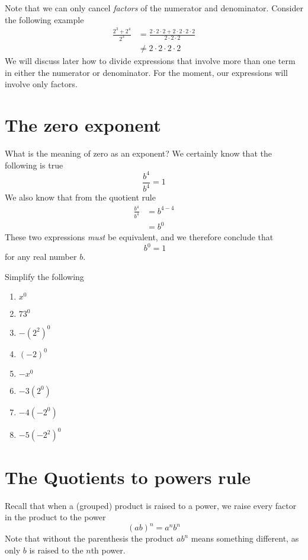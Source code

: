 Note that we can only cancel {\em factors} of the numerator and denominator. Consider the following example
\begin{align*}
	\frac{2^3+2^4}{2^3} & =	 \frac{2\cdot 2\cdot 2 + 2\cdot2\cdot2\cdot2}{2\cdot 2\cdot 2} \\
	                    & \ne	 2\cdot 2\cdot 2\cdot 2                                      
\end{align*} 
We will discuss later how to divide expressions that involve more than one term in either the numerator
or denominator. For the moment, our expressions will involve only factors.

\section{The zero exponent}
What is the meaning of zero as an exponent? We certainly know that the following is true
\[
	\frac{b^4}{b^4} = 1
\]
We also know that from the quotient rule
\begin{align*}
	\frac{b^4}{b^4} & =		b^{4-4} \\
	                & =		b^0     
\end{align*} 
These two expressions {\em must} be equivalent, and we therefore conclude
that
\[\
	b^0=1
\]
for any real number $b$.
\begin{myexample}
Simplify the following
\drillandskill
\end{myexample}
\begin{multicols}{4}
	\begin{enumerate}
		\item $x^0$
		\item $73^0$
		\item $-(2^2)^0$
		\item $(-2)^0$
		\item $-x^0$
		\item $-3(2^0)$
		\item $-4(-2^0)$
		\item $-5(-2^2)^0$
	\end{enumerate}
\end{multicols}

\section{The Quotients to powers rule}
Recall that when a (grouped) product is raised to a power, we raise every \gls{factor} in the product to the power
\[
	(ab)^n = a^n b^n
\]
Note that without the parenthesis the product $ab^n$  means something different, as only $b$ is raised to the
$n$th power.

